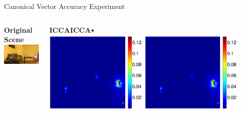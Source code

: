\documentclass[8pt]{beamer}
\newcommand{\iccap}{ICCA\texttt{+} }
\begin{document}
\begin{frame}{Canonical Vector Accuracy Experiment}

\begin{columns}[T]
  \begin{column}{0.3\textwidth}
    \vspace{15ex}
    \begin{center}
    \textbf{Original Scene}
    \includegraphics[width=\textwidth]{figures/flashing_left.png}
\end{center}
  \end{column}
  \begin{column}{0.7\textwidth}
    \begin{center}
      \textbf{ICCA}\hspace{20ex}\textbf{\iccap}\phantom{blah}\\
      \includegraphics[width=0.45\textwidth]{figures/flashing1_left1_icca.pdf}\hspace{2ex}
      \includegraphics[width=0.45\textwidth]{figures/flashing1_left1_opt.pdf}\\[2ex]

\end{center}
\end{column}
\end{columns}
\end{frame}
\end{document}
